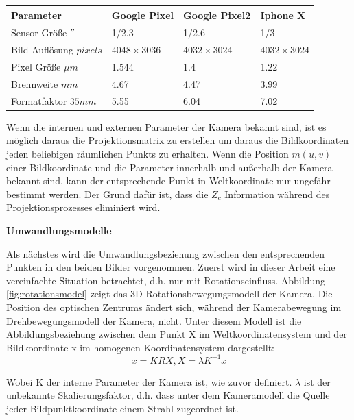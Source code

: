 \begin{table}[htb]
	\label{tbl:Parameter der Kameras im Vergleich}
	\footnotesize
	\centering
	\begin{tabular}{|p{3cm}|p{2.5cm}|p{2.5cm}|p{2.5cm}|}	%
	\toprule
	\textbf{Parameter} & \textbf{Google Pixel} & \textbf{Google Pixel2} & \textbf{Iphone X}\\
	\midrule
	Sensor Größe $''$ & 1/2.3 & 1/2.6 & 1/3 \\
	Bild Auflösung $pixels$ & $4048 \times 3036$ & $4032 \times 3024$ & $4032 \times 3024$ \\
	Pixel Größe $\mu m$ & 1.544 & 1.4 & 1.22 \\	
	Brennweite $mm$ & 4.67 & 4.47 & 3.99 \\
	Formatfaktor $35 mm$  	&5.55	&6.04	&7.02	\\
	
	\bottomrule
	\end{tabular}
\end{table} 


Wenn die internen und externen Parameter der Kamera bekannt sind, ist es möglich daraus die Projektionsmatrix zu erstellen um daraus die Bildkoordinaten jeden beliebigen räumlichen Punkts zu erhalten. Wenn die Position $m(u,v)$ einer Bildkoordinate und die Parameter innerhalb und außerhalb der Kamera bekannt sind, kann der entsprechende Punkt in Weltkoordinate nur ungefähr bestimmt werden. Der Grund dafür ist, dass die $Z_c$ Information während des Projektionsprozesses eliminiert wird. 

\textbf{Umwandlungsmodelle}

Als nächstes wird die Umwandlungsbeziehung zwischen den entsprechenden Punkten in den beiden Bilder vorgenommen. Zuerst wird in dieser Arbeit eine vereinfachte Situation betrachtet, d.h. nur mit Rotationseinfluss. Abbildung \ref{fig:rotationsmodel} zeigt das 3D-Rotationsbewegungsmodell der Kamera. Die Position des optischen Zentrums ändert sich, während der Kamerabewegung im Drehbewegungsmodell der Kamera, nicht. Unter diesem Modell ist die Abbildungsbeziehung zwischen dem Punkt X im Weltkoordinatensystem und der Bildkoordinate x im homogenen Koordinatensystem dargestellt: 
\begin{equation}
   x = KRX, X = \lambda  K^{-1} x
\end{equation}

Wobei K der interne Parameter der Kamera ist, wie zuvor definiert. $\lambda$ ist der unbekannte Skalierungsfaktor, d.h. dass unter dem Kameramodell die Quelle jeder Bildpunktkoordinate einem Strahl zugeordnet ist.

